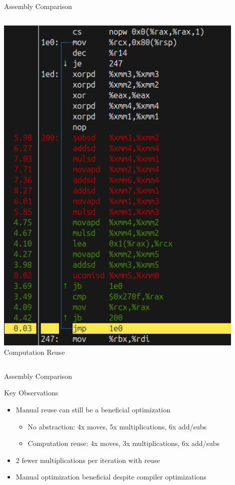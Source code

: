 \documentclass{beamer}
\begin{document}
\begin{frame}{Assembly Comparison}
\begin{columns}
\begin{column}{0.45\textwidth}
            \includegraphics[width=0.9\textwidth,height=0.8\textheight,keepaspectratio]{images/V5_assembly_normal.png}
            \\
            \footnotesize Computation Reuse
        \end{column}
    \end{columns}
\end{frame}

\begin{frame}{Assembly Comparison}
    \begin{block}{Key Observations}
        \begin{itemize}
            \item Manual reuse can still be a beneficial optimization
            \begin{itemize}
                \item No abstraction: 4x moves, 5x multiplications, 6x add/subs
                \item Computation reuse: 4x moves, 3x multiplications, 6x add/subs
            \end{itemize}
            \item 2 fewer multiplications per iteration with reuse
            \item Manual optimization beneficial despite compiler optimizations
        \end{itemize}
    \end{block}
\end{frame}
\end{document}
